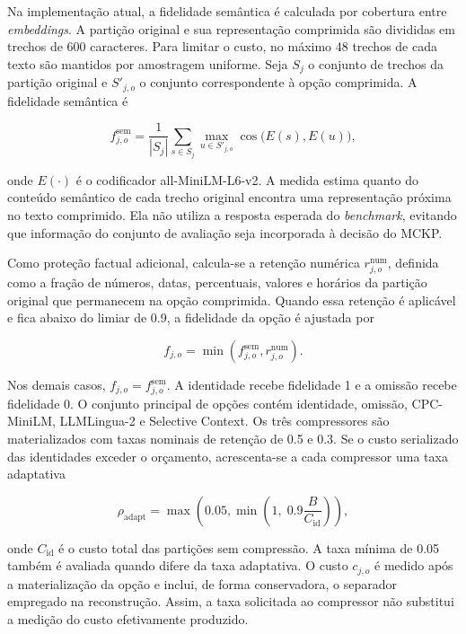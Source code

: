 Na implementação atual, a fidelidade semântica é calculada por cobertura entre \textit{embeddings}. A partição original e sua representação comprimida são divididas em trechos de 600 caracteres. Para limitar o custo, no máximo 48 trechos de cada texto são mantidos por amostragem uniforme. Seja $S_j$ o conjunto de trechos da partição original e $S'_{j,o}$ o conjunto correspondente à opção comprimida. A fidelidade semântica é

\begin{equation}
\label{eq:fidelidade-semantica-implementada}
f^{\mathrm{sem}}_{j,o}
=
\frac{1}{|S_j|}
\sum_{s\in S_j}
\max_{u\in S'_{j,o}}
\cos\bigl(E(s),E(u)\bigr),
\end{equation}

onde $E(\cdot)$ é o codificador all-MiniLM-L6-v2. A medida estima quanto do conteúdo semântico de cada trecho original encontra uma representação próxima no texto comprimido. Ela não utiliza a resposta esperada do \textit{benchmark}, evitando que informação do conjunto de avaliação seja incorporada à decisão do MCKP.

Como proteção factual adicional, calcula-se a retenção numérica $r^{\mathrm{num}}_{j,o}$, definida como a fração de números, datas, percentuais, valores e horários da partição original que permanecem na opção comprimida. Quando essa retenção é aplicável e fica abaixo do limiar de 0.9, a fidelidade da opção é ajustada por

\begin{equation}
\label{eq:fidelidade-ajustada}
f_{j,o}
=
\min\left(f^{\mathrm{sem}}_{j,o},r^{\mathrm{num}}_{j,o}\right).
\end{equation}

Nos demais casos, $f_{j,o}=f^{\mathrm{sem}}_{j,o}$. A identidade recebe fidelidade 1 e a omissão recebe fidelidade 0. O conjunto principal de opções contém identidade, omissão, CPC-MiniLM, LLMLingua-2 e Selective Context. Os três compressores são materializados com taxas nominais de retenção de 0.5 e 0.3. Se o custo serializado das identidades exceder o orçamento, acrescenta-se a cada compressor uma taxa adaptativa

\begin{equation}
\label{eq:taxa-adaptativa}
\rho_{\mathrm{adapt}}
=
\max\left(0.05,
\min\left(1,\;0.9\frac{B}{C_{\mathrm{id}}}\right)\right),
\end{equation}

onde $C_{\mathrm{id}}$ é o custo total das partições sem compressão. A taxa mínima de 0.05 também é avaliada quando difere da taxa adaptativa. O custo $c_{j,o}$ é medido após a materialização da opção e inclui, de forma conservadora, o separador empregado na reconstrução. Assim, a taxa solicitada ao compressor não substitui a medição do custo efetivamente produzido.

